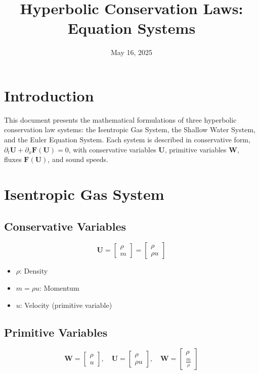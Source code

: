\documentclass[12pt]{article}
\title{Hyperbolic Conservation Laws: Equation Systems}
\author{}
\date{May 16, 2025}
\begin{document}
\maketitle

\section*{Introduction}
This document presents the mathematical formulations of three hyperbolic conservation law systems: the Isentropic Gas System, the Shallow Water System, and the Euler Equation System. Each system is described in conservative form, $\partial_t \mathbf{U} + \partial_x \mathbf{F}(\mathbf{U}) = 0$, with conservative variables $\mathbf{U}$, primitive variables $\mathbf{W}$, fluxes $\mathbf{F}(\mathbf{U})$, and sound speeds.

\section{Isentropic Gas System}
\subsection{Conservative Variables}
\[
\mathbf{U} = \begin{bmatrix} \rho \\ m \end{bmatrix} = \begin{bmatrix} \rho \\ \rho u \end{bmatrix}
\]
\begin{itemize}
    \item $\rho$: Density
    \item $m = \rho u$: Momentum
    \item $u$: Velocity (primitive variable)
\end{itemize}

\subsection{Primitive Variables}
\[
\mathbf{W} = \begin{bmatrix} \rho \\ u \end{bmatrix}, \quad \mathbf{U} = \begin{bmatrix} \rho \\ \rho u \end{bmatrix}, \quad \mathbf{W} = \begin{bmatrix} \rho \\ \frac{m}{\rho} \end{bmatrix}
\]
\end{document}
